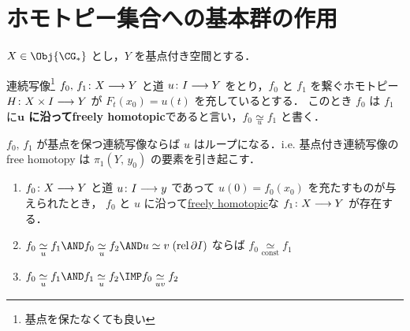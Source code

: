 \documentclass[algtopo_main]{subfiles}
\begin{document}
\section{ホモトピー集合への基本群の作用}

$X \in \Obj{\CG_*}$ とし，$Y$ を基点付き空間とする．

\begin{mydef}[label=def:freely-homotopic]{}
    連続写像\footnote{基点を保たなくても良い} $f_0,\, f_1 \colon X \longrightarrow Y$ と道 $u \colon I \longrightarrow Y$ をとり，$f_0$ と $f_1$ を繋ぐホモトピー $H \colon X \times I \longrightarrow Y$ が $F_t (x_0) = u(t)$ を充しているとする．
    このとき $f_0$ は $f_1$ に\textbf{$\bm{u}$ に沿ってfreely homotopic}であると言い，$f_0 \underset{u}{\simeq} f_1$ と書く．
\end{mydef}

\begin{marker}
    $f_0,\, f_1$ が基点を保つ連続写像ならば $u$ はループになる．i.e. 基点付き連続写像のfree homotopy は $\pi_1 (Y,\, y_0)$ の要素を引き起こす．
\end{marker}

\begin{mylem}[label=lem:freely-homotopic]{}
    \begin{enumerate}
        \item $f_0 \colon X \longrightarrow Y$ と道 $u \colon I \longrightarrow y$ であって $u(0) = f_0(x_0)$ を充たすものが与えられたとき，
        $f_0$ と $u$ に沿って\hyperref[def:freely-homotopic]{freely homotopic}な $f_1 \colon X \longrightarrow Y$ が存在する．
        \item $f_0 \underset{u}{\simeq} f_1 \AND f_0 \underset{u}{\simeq} f_2 \AND u \simeq v\; (\text{rel}\, \partial I)$ ならば $f_0 \underset{\text{const}}{\simeq} f_1$
        \item $f_0 \underset{u}{\simeq} f_1 \AND f_1 \underset{u}{\simeq} f_2 \IMP f_0 \underset{uv}{\simeq} f_2$
    \end{enumerate}
\end{mylem}
\end{document}
